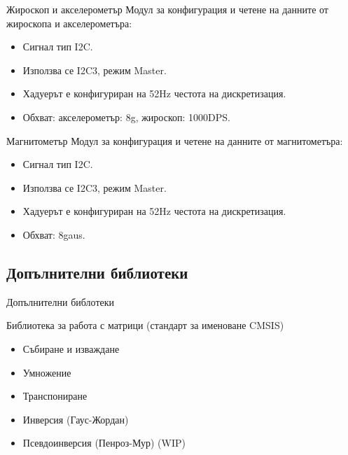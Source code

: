 \documentclass{beamer}
\begin{document}
\begin{frame}[t]
	\pause
	\begin{block}{Жироскоп и акселерометър}
		\pause
		Модул за конфигурация и четене на данните от жироскопа и акселерометъра:
		\begin{itemize}
			\pause
			\item Сигнал тип I2C.
			\pause
			\item Използва се I2C3, режим Master.
			\pause
			\item Хадуерът е конфигуриран на 52Hz честота на дискретизация.
			\pause
			\item Обхват: акселерометър: 8g, жироскоп: 1000DPS.
		\end{itemize}
	\end{block}
\end{frame}

\begin{frame}[t]
	\pause
	\begin{block}{Магнитометър}
		\pause
		Модул за конфигурация и четене на данните от магнитометъра:
		\begin{itemize}
			\pause
			\item Сигнал тип  I2C.
			\pause
			\item Използва се I2C3, режим Master.
			\pause
			\item Хадуерът е конфигуриран на 52Hz честота на дискретизация.
			\pause
			\item Обхват: 8gaus.
		\end{itemize}
	\end{block}
\end{frame}

\subsection{Допълнителни библиотеки}

\begin{frame}{Допълнителни библотеки}
	\pause
	\begin{block}{Библиотека за работа с матрици (стандарт за именоване CMSIS)}
		\begin{itemize}
			\pause
			\item Събиране и изваждане
			\pause
			\item Умножение
			\pause
			\item Транспониране
			\pause
			\item Инверсия (Гаус-Жордан)
			\pause
			\item  Псевдоинверсия (Пенроз-Мур) (WIP)
		\end{itemize}
	\end{block}

\end{frame}
\end{document}
